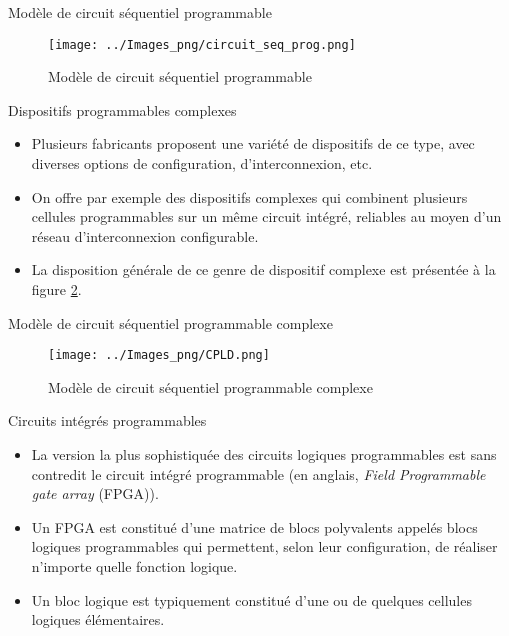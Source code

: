\documentclass[presentation]{beamer}
\begin{document}
\begin{frame}[label={sec:orgaccff5d}]{Modèle de circuit séquentiel programmable}
\begin{figure}[htbp]
\centering
\texttt{[image: ../Images\_png/circuit\_seq\_prog.png]}
\caption{\label{fig:org11d1364}Modèle de circuit séquentiel programmable}
\end{figure} 
\end{frame}

\begin{frame}[label={sec:org808d0b0}]{Dispositifs programmables complexes}
\begin{itemize}
\item Plusieurs fabricants proposent une variété de dispositifs de ce type, avec diverses options de configuration, d'interconnexion, etc.

\item On offre par exemple des dispositifs complexes qui combinent plusieurs cellules programmables sur un même circuit intégré, reliables au moyen d'un réseau d'interconnexion configurable.

\item La disposition générale de ce genre de dispositif complexe est présentée à la figure \ref{fig:orgf461c15}.
\end{itemize}
\end{frame}

\begin{frame}[label={sec:orgcc222a2}]{Modèle de circuit séquentiel programmable complexe}
\begin{figure}[htbp]
\centering
\texttt{[image: ../Images\_png/CPLD.png]}
\caption{\label{fig:orgf461c15}Modèle de circuit séquentiel programmable complexe}
\end{figure}
\end{frame}

\begin{frame}[label={sec:org7223fe3}]{Circuits intégrés programmables}
\begin{itemize}
\item La version la plus sophistiquée des circuits logiques programmables est sans contredit le \alert{circuit intégré programmable} (en anglais, \emph{Field Programmable gate array} (FPGA)).

\item Un FPGA est constitué d'une matrice de blocs polyvalents appelés \alert{blocs logiques programmables} qui permettent, selon leur configuration, de réaliser n'importe quelle fonction logique.

\item Un bloc logique est typiquement constitué d'une ou de quelques \alert{cellules logiques} élémentaires.
\end{itemize}
\end{frame}
\end{document}
